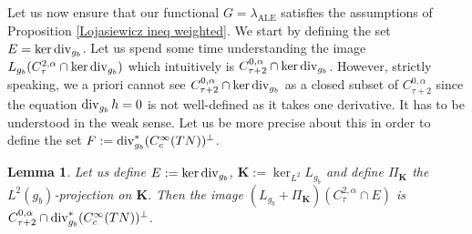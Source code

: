 \documentclass[a4paper,11pt,reqno]{amsart}
\newtheorem{lemma}[defn]{Lemma}
\def\div{\mathop{\rm div}\nolimits}
\def\div{\mathop{\rm div}\nolimits}
\numberwithin{equation}{section}
\begin{document}
	
	Let us now ensure that our functional $G=\lambda_{\operatorname{ALE}}$ satisfies the assumptions of Proposition \ref{Lojasiewicz ineq weighted}. We start by defining the set $E =\ker \div_{g_b}$. Let us spend some time understanding the image $L_{g_b}(C^{2,\alpha}_{\tau}\cap \ker\div_{g_b})$ which intuitively is $C^{0,\alpha}_{\tau+2}\cap \ker\div_{g_b}$. However, strictly speaking, we a priori cannot see $C^{0,\alpha}_{\tau+2}\cap \ker\div_{g_b}$ as a closed subset of $C^{0,\alpha}_{\tau+2}$ since the equation $\div_{g_b}h=0$ is not well-defined as it takes one derivative. It has to be understood in the weak sense. Let us be more precise about this in order to define the set $F:=\div^*_{g_b}(C^\infty_c(TN))^\perp$. 
	\begin{lemma}\label{definition E et F pour loja}
		Let us define $E := \ker \div_{g_b}$, $\mathbf{K} := \ker_{L^2} L_{g_b}$ and define $\Pi_\mathbf{K}$ the $L^2(g_b)$-projection on $\mathbf{K}$. Then the image $(L_{g_b} + \Pi_{\mathbf{K}})(C^{2,\alpha}_{\tau}\cap E)$ is $C^{0,\alpha}_{\tau+2}\cap \div^*_{g_b}(C^\infty_c(TN))^\perp$.
	\end{lemma}	
\end{document}

